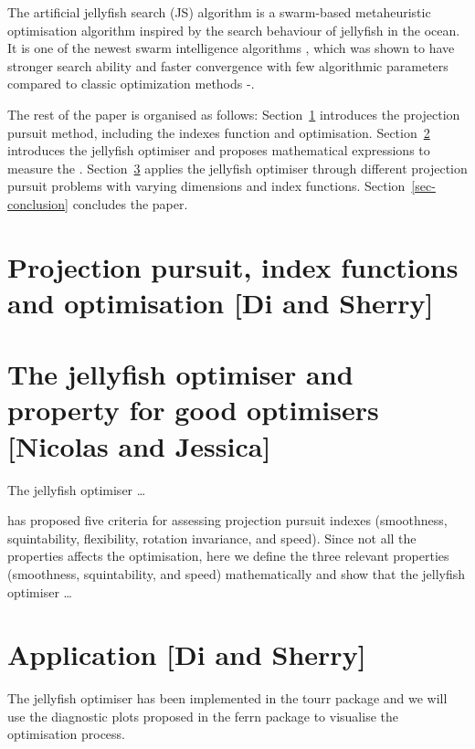 \documentclass[
  number,
  preprint,
  3p]{elsarticle}
\begin{document}
The artificial jellyfish search (JS) algorithm \citep{chou_novel_2021}
is a swarm-based metaheuristic optimisation algorithm inspired by the
search behaviour of jellyfish in the ocean. It is one of the newest
swarm intelligence algorithms \citep{rajwar_exhaustive_2023}, which was
shown to have stronger search ability and faster convergence with few
algorithmic parameters compared to classic optimization methods
\citep{chou_novel_2021}-\citep{chou_recent_2022}.

The rest of the paper is organised as follows:
Section~\ref{sec-background} introduces the projection pursuit method,
including the indexes function and optimisation.
Section~\ref{sec-theory} introduces the jellyfish optimiser and proposes
mathematical expressions to measure the . Section~\ref{sec-simulation}
applies the jellyfish optimiser through different projection pursuit
problems with varying dimensions and index functions.
Section~\ref{sec-conclusion} concludes the paper.

\hypertarget{sec-background}{%
\section{Projection pursuit, index functions and optimisation {[}Di and
Sherry{]}}\label{sec-background}}

\hypertarget{sec-theory}{%
\section{The jellyfish optimiser and property for good optimisers
{[}Nicolas and Jessica{]}}\label{sec-theory}}

The jellyfish optimiser \citep{chou_novel_2021} \ldots{}

\citet{laa_using_2020} has proposed five criteria for assessing
projection pursuit indexes (smoothness, squintability, flexibility,
rotation invariance, and speed). Since not all the properties affects
the optimisation, here we define the three relevant properties
(smoothness, squintability, and speed) mathematically and show that the
jellyfish optimiser \ldots{}

\hypertarget{sec-simulation}{%
\section{Application {[}Di and Sherry{]}}\label{sec-simulation}}

The jellyfish optimiser has been implemented in the tourr package
\citep{wickham_tourr_2011} and we will use the diagnostic plots proposed
in the ferrn package \citep{RJ-2021-105} to visualise the optimisation
process.
\end{document}
